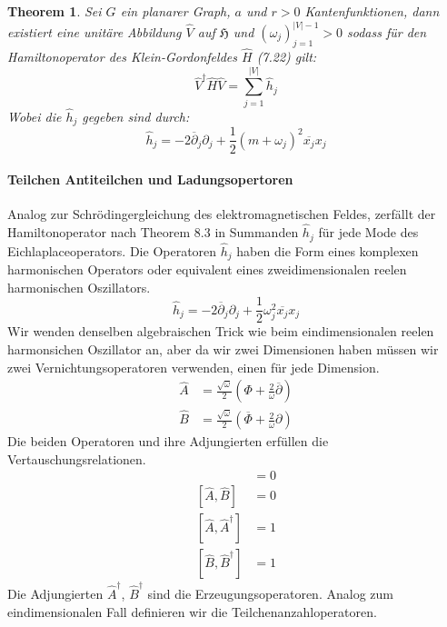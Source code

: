 \documentclass[11pt,a4paper,leqno]{report}
\newtheorem{theorem}{Theorem}[chapter]
\numberwithin{equation}{chapter}
\begin{document}
\noindent
\begin{theorem}
	Sei $G$ ein planarer Graph, $a$ und $r>0$ Kantenfunktionen, dann existiert eine unit\"are Abbildung $\hat{V}$ auf $\mathfrak{H}$ und $(\omega_j)_{j=1}^{|V|-1}>0$ sodass f\"ur den Hamiltonoperator des Klein-Gordonfeldes $\hat{H}$ (7.22) gilt:
	\begin{equation}
		\hat{V}^\dagger\hat{H}\hat{V}  = \sum_{j=1}^{|V|}\hat{h}_j
	\end{equation}
	Wobei die $\hat{h}_j$ gegeben sind durch:
	\begin{equation}
		\hat{h}_j= -2\overline{\partial}_j\partial_j + \frac{1}{2}(m + \omega_j)^2 \overline{x_j}x_j
	\end{equation}	
\end{theorem}
\paragraph{Teilchen Antiteilchen und Ladungsopertoren} Analog zur Schr\"odingergleichung des elektromagnetischen Feldes, zerf\"allt der Hamiltonoperator nach Theorem 8.3 in Summanden $\hat{h}_j$ f\"ur jede Mode des Eichlaplaceoperators. Die Operatoren  $\hat{h}_j$ haben die Form eines komplexen harmonischen Operators oder equivalent eines zweidimensionalen reelen harmonischen Oszillators.
\begin{equation}
	\hat{h}_j= -2\overline{\partial}_j\partial_j + \frac{1}{2}\omega_j^2 \overline{x_j}x_j
\end{equation}	
Wir wenden denselben algebraischen Trick wie beim eindimensionalen reelen harmonsichen Oszillator an, aber da wir zwei Dimensionen haben m\"ussen wir zwei Vernichtungsoperatoren verwenden, einen f\"ur jede Dimension.\\
\begin{align}
	\hat{A} &= \frac{\sqrt{\omega}}{2}(\Phi + \frac{2}{\omega}\overline{\partial})\\
	\hat{B} &= \frac{\sqrt{\omega}}{2}(\overline{\Phi} + \frac{2}{\omega}\partial)
\end{align}
Die beiden Operatoren und ihre Adjungierten erf\"ullen die Vertauschungsrelationen.
\begin{align*}
	[\hat{A}, \hat{B}^\dagger] &= 0\\
	[\hat{A}, \hat{B}] &= 0\\
	[\hat{A}, \hat{A}^\dagger] &= 1\\
	[\hat{B}, \hat{B}^\dagger] &= 1
\end{align*}
Die Adjungierten $\hat{A}^\dagger$, $\hat{B}^\dagger$ sind die Erzeugungsoperatoren. Analog zum eindimensionalen Fall definieren wir die Teilchenanzahloperatoren.
\end{document}
